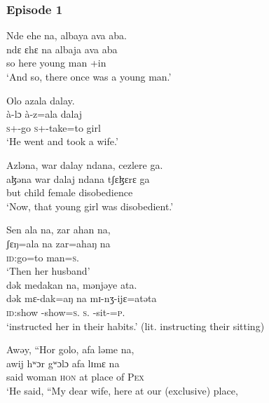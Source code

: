 \subsubsection*{Episode 1}
\ea    Nde  ehe  na,    albaya  ava  aba.        \\
\gll ndɛ    ɛhɛ  na   albaja       ava  aba \\
so       here    {\PSP}  {young man}  {\EXT}{}+in   {\EXT}\\
\glt ‘And so, there once was a young  man.’\\
\z

\ea    Olo  azala  dalay.\\
\gll à-lɔ            à-z=ala  dalaj\\ 
\textsc{s}+{\PFV}-go    \textsc{s}+{\PFV}-take=to  girl\\
 \glt ‘He went and took a wife.’
\z

\ea   Azləna, war  dalay  ndana,  cezlere  ga.\\
\gll aɮəna  war   dalaj   ndana tʃɛɮɛrɛ          ga\\
but  child      female    {\DEM}  disobedience {\ADJ}\\
\glt ‘Now, that young girl was disobedient.’\\
\z

\ea   Sen  ala  na,  zar  ahan  na,\\
\gll ʃɛŋ=ala   na  zar=ahaŋ    na\\
\textsc{id}:go=to          {\PSP}  man=\textsc{s}.{\POSS}    {\PSP}\\
\glt ‘Then her husband’\\

\medskip
 dək  medakan  na,  mənjəye  ata.\\
\gll dək    mɛ-dak=aŋ            na        mɪ-nʒ-ijɛ=atəta\\ 
\textsc{id}:show   {\NOM}-show=\textsc{s}.{\IO}   \textsc{s}.{\DO}   {\NOM}{}-sit-{\CL}=\textsc{p}.{\POSS}\\
\glt ‘instructed her in their habits.’ (lit. instructing their sitting)
\z

\ea  Awəy, “Hor  golo,  afa  ləme  na,\\
\gll awij    hʷɔr gʷɔlɔ afa      lɪmɛ    na\\
said   woman  \textsc{hon}  {at place of}    \textsc{Pex}     {\PSP}\\
\glt ‘He said, “My dear wife, here at our (exclusive) place,\\

